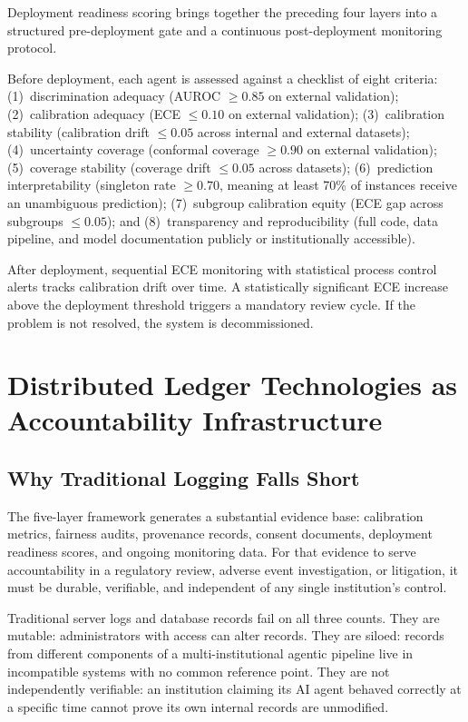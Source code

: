 \documentclass[12pt,a4paper]{article}
\begin{document}
Deployment readiness scoring brings together the preceding four
layers into a structured pre-deployment gate and a continuous
post-deployment monitoring protocol.

Before deployment, each agent is assessed against a checklist of
eight criteria: (1)~discrimination adequacy (AUROC $\geq 0.85$
on external validation); (2)~calibration adequacy
(ECE $\leq 0.10$ on external validation); (3)~calibration
stability (calibration drift $\leq 0.05$ across internal and
external datasets); (4)~uncertainty coverage (conformal coverage
$\geq 0.90$ on external validation); (5)~coverage stability
(coverage drift $\leq 0.05$ across datasets); (6)~prediction
interpretability (singleton rate $\geq 0.70$, meaning at least
70\% of instances receive an unambiguous prediction);
(7)~subgroup calibration equity (ECE gap across subgroups
$\leq 0.05$); and (8)~transparency and reproducibility (full
code, data pipeline, and model documentation publicly or
institutionally accessible).\cite{collins2024eval}

After deployment, sequential ECE monitoring with statistical
process control alerts tracks calibration drift over time. A
statistically significant ECE increase above the deployment
threshold triggers a mandatory review cycle. If the problem is
not resolved, the system is decommissioned.

\section*{Distributed Ledger Technologies as Accountability
Infrastructure}

\subsection*{Why Traditional Logging Falls Short}

The five-layer framework generates a substantial evidence base:
calibration metrics, fairness audits, provenance records, consent
documents, deployment readiness scores, and ongoing monitoring
data. For that evidence to serve accountability in a regulatory
review, adverse event investigation, or litigation, it must be
durable, verifiable, and independent of any single institution's
control.

Traditional server logs and database records fail on all three
counts. They are mutable: administrators with access can alter
records. They are siloed: records from different components of a
multi-institutional agentic pipeline live in incompatible systems
with no common reference point. They are not independently
verifiable: an institution claiming its AI agent behaved correctly
at a specific time cannot prove its own internal records are
unmodified.
\end{document}
